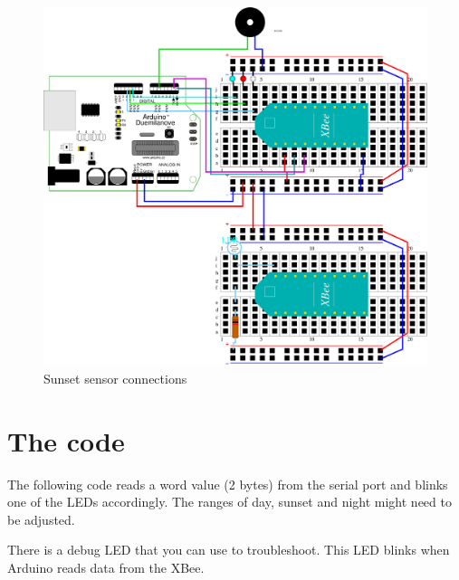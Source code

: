 \begin{figure}[htbp]
  \centering
  \includegraphics[width=0.9\linewidth]{figures/sunset_sensor.eps}
  \caption{Sunset sensor connections}
  \label{fig:sunset_sensor}
\end{figure}

\section{The code}

The following code reads a word value (2 bytes) from the serial port and blinks one of the LEDs accordingly.
The ranges of day, sunset and night might need to be adjusted. 

There is a debug LED that you can use to troubleshoot.
This LED blinks when Arduino reads data from the XBee.


